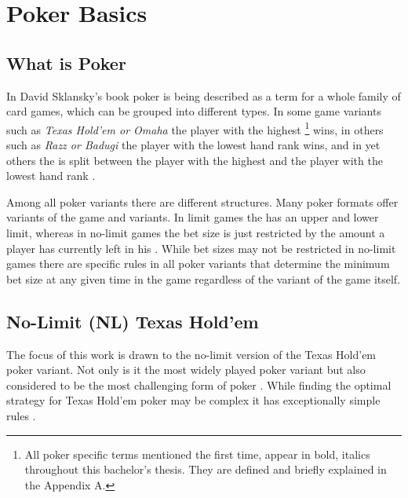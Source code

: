 
\chapter{Poker Basics}
\label{cha:pokerBasics}
\section{What is Poker}
In David Sklansky's book \cite{theory_of_poker} poker is being described as a term for a whole family of card games, which can be grouped into different types. In some game variants such as  \textit{Texas Hold'em or Omaha} the player with the highest  \footnote{All poker specific terms mentioned the first time, appear in bold, italics throughout this bachelor's thesis. They are defined and briefly explained in the Appendix A.} wins, in others such as \textit{Razz or Badugi} the player with the lowest hand rank wins, and in yet others the  is split between the player with the highest and the player with the lowest hand rank \cite{theory_of_poker}.\par
Among all poker variants there are different  structures. Many poker formats offer  variants of the game and  variants. In limit games the  has an upper and lower limit, whereas in no-limit games the bet size is just restricted by the amount a player has currently left in his  \cite{theory_of_poker}. While bet sizes may not be restricted in no-limit games there are specific rules in all poker variants that determine the minimum bet size at any given time in the game regardless of the variant of the game itself.
\section{No-Limit (NL) Texas Hold'em}
The focus of this work is drawn to the no-limit version of the Texas Hold'em poker variant. Not only is it the most widely played poker variant but also considered to be the most challenging form of poker \cite{strong_poker}. While finding the optimal strategy for Texas Hold'em poker may be complex it has exceptionally simple rules \cite{billings_phd}.
